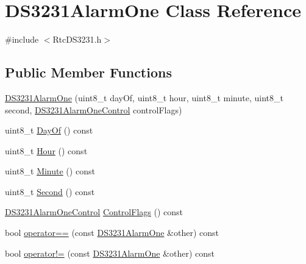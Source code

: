 \hypertarget{class_d_s3231_alarm_one}{}\section{D\+S3231\+Alarm\+One Class Reference}
\label{class_d_s3231_alarm_one}


{\ttfamily \#include $<$Rtc\+D\+S3231.\+h$>$}

\subsection*{Public Member Functions}
\begin{DoxyCompactItemize}
\item 
\hyperlink{class_d_s3231_alarm_one_adededa4532de489d94f4abba22484163}{D\+S3231\+Alarm\+One} (uint8\+\_\+t day\+Of, uint8\+\_\+t hour, uint8\+\_\+t minute, uint8\+\_\+t second, \hyperlink{_rtc_d_s3231_8h_aee303344b910c99a596a83018642f2a7}{D\+S3231\+Alarm\+One\+Control} control\+Flags)
\item 
uint8\+\_\+t \hyperlink{class_d_s3231_alarm_one_ad05feb3025d65196ebc34f77513b05ee}{Day\+Of} () const 
\item 
uint8\+\_\+t \hyperlink{class_d_s3231_alarm_one_a354241c06270f7d5a719ee1d80d03d0b}{Hour} () const 
\item 
uint8\+\_\+t \hyperlink{class_d_s3231_alarm_one_ae9db3ad8aa5d55d9bc06dec85fe6d453}{Minute} () const 
\item 
uint8\+\_\+t \hyperlink{class_d_s3231_alarm_one_aaed150a440a8b7652fbb34c3dd5d140b}{Second} () const 
\item 
\hyperlink{_rtc_d_s3231_8h_aee303344b910c99a596a83018642f2a7}{D\+S3231\+Alarm\+One\+Control} \hyperlink{class_d_s3231_alarm_one_a0622a07f3ea7ee9394b4d6472511d4a2}{Control\+Flags} () const 
\item 
bool \hyperlink{class_d_s3231_alarm_one_a1715cdd961a0e87dbeb03f283daf02a1}{operator==} (const \hyperlink{class_d_s3231_alarm_one}{D\+S3231\+Alarm\+One} \&other) const 
\item 
bool \hyperlink{class_d_s3231_alarm_one_a01641048866411287fb15200d42acae1}{operator!=} (const \hyperlink{class_d_s3231_alarm_one}{D\+S3231\+Alarm\+One} \&other) const 
\end{DoxyCompactItemize}
